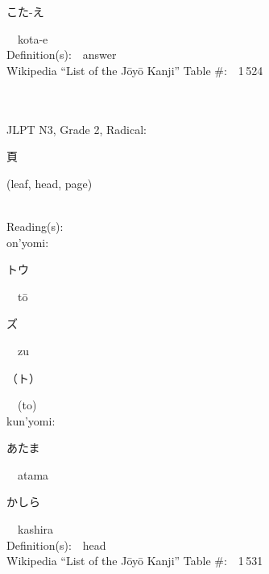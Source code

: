 \begin{multicols}{2}
{\hspace*{2em}}{\begin{CJK}{UTF8}{min} こた-え \end{CJK}}\ \ kota-e\ \ \\
Definition(s):\ \ answer \\
Wikipedia ``List of the J\=oy\=o Kanji'' Table \#:\ \ 1\,524 \\
\ \ \\
{\fontsize{34pt}{40pt}  }\ \ \\  %
{JLPT N3, Grade 2, Radical:\ \ {\begin{CJK}{UTF8}{min} 頁 \end{CJK}} (leaf, head, page) } \\
Reading(s):\ \ \\
{\hspace*{1em}}on'yomi:\ \ \\
{\hspace*{2em}}{\begin{CJK}{UTF8}{min} トウ \end{CJK}}\ \ t\=o\ \ \\
{\hspace*{2em}}{\begin{CJK}{UTF8}{min} ズ \end{CJK}}\ \ zu\ \ \\
{\hspace*{2em}}{\begin{CJK}{UTF8}{min} （ト） \end{CJK}}\ \ (to)\ \ \\
{\hspace*{1em}}kun'yomi:\ \ \\
{\hspace*{2em}}{\begin{CJK}{UTF8}{min} あたま \end{CJK}}\ \ atama\ \ \\
{\hspace*{2em}}{\begin{CJK}{UTF8}{min} かしら \end{CJK}}\ \ kashira\ \ \\
Definition(s):\ \ head \\
Wikipedia ``List of the J\=oy\=o Kanji'' Table \#:\ \ 1\,531 \\
\ \ \\
{\fontsize{34pt}{40pt}  }\ \ \\  %

\end{multicols}
